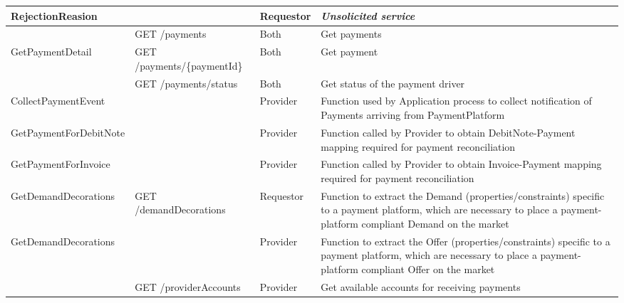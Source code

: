 \begin{enumerate}
\begin{enumerate}
\begin{table}
\begin{center}
\begin{tabular}{|p{3cm}|p{7cm}|p{1.5cm}|p{4cm}|}
RejectionReasion		&												&	Requestor	&	{\it Unsolicited service} 
																							\newline 	{\it Bad Service}
																							\newline 	{\it Incorrect Amount} \\
\hline

						&	GET /payments 								&	Both 		& 	Get payments \\
\hline

GetPaymentDetail		&	GET /payments/\{paymentId\}					&	Both 		&	Get payment \\
\hline

						& 	GET /payments/status 						& 	Both 		& 	Get status of the payment driver \\
\hline

CollectPaymentEvent		&												&	Provider 	&	Function used by Application process to 
																							collect notification of Payments arriving from PaymentPlatform \\
\hline

GetPaymentForDebitNote	&												&	Provider 	&	Function called by Provider to
																							obtain DebitNote-Payment mapping
																							required for payment reconciliation \\
\hline

GetPaymentForInvoice	&												&	Provider 	&	Function called by Provider to
																							obtain Invoice-Payment mapping
																							required for payment reconciliation \\
\hline

GetDemandDecorations	&	GET /demandDecorations 						&	Requestor	&	Function to extract the Demand (properties/constraints) specific to
																							a payment platform, which are necessary to place 
																							a payment-platform compliant Demand on the market \\
\hline

GetDemandDecorations	&						 						&	Provider	&	Function to extract the Offer (properties/constraints) specific to
																							a payment platform, which are necessary to place 
																							a payment-platform compliant Offer on the market \\
\hline
																									
						&	GET /providerAccounts						&	Provider 	&	Get available accounts for receiving payments \\
\hline


\end{tabular}
\end{center}
\end{table}
\end{enumerate}
\end{enumerate}
